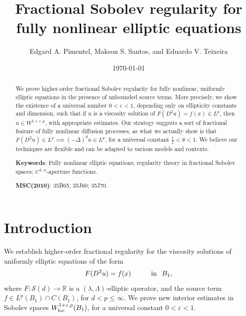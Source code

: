 \documentclass[10pt]{article} %
\begin{document}
\title{\bf Fractional Sobolev regularity for fully nonlinear elliptic equations}
\author{Edgard A. Pimentel, Makson S. Santos, and Eduardo V. Teixeira}

	
\date{\today} 

\maketitle

\begin{abstract}

\noindent  We prove higher-order fractional Sobolev regularity for fully nonlinear, uniformly elliptic equations in the presence of unbounded source terms. More precisely, we show the existence of a universal number $0< \varepsilon <1$, depending only on ellipticity constants and dimension, such that if $u$ is a viscosity solution of $F(D^2u) = f(x) \in L^p$, then $u\in  W^{1+\varepsilon,p}$, with appropriate estimates. Our strategy suggests a sort of fractional feature of fully nonlinear diffusion processes, as what we actually show is that $F(D^2u) \in L^p \implies (-\Delta)^\theta u \in L^p$, for a universal constant $\frac{1}{2} < \theta <1$.  We believe our techniques are flexible and can be adapted to various models and contexts.

\medskip

\noindent \textbf{Keywords}: Fully nonlinear elliptic equations; regularity theory in fractional Sobolev spaces; $ C ^{1,\alpha}$-aperture functions.

\medskip 

\noindent \textbf{MSC(2010)}: 35B65; 35J60; 35J70.
\end{abstract}


\section{Introduction}\label{introduction}

We establish higher-order fractional regularity for the viscosity solutions of uniformly elliptic equations of the form
\begin{equation}\label{eq_main}
	F(D^2u) = f(x) \hspace{.4in}\mbox{in}\hspace{.1in} B_1,
\end{equation}
where $F\colon \mathcal{S}(d)\to\mathbb{R}$ is a $(\lambda,\Lambda)$-elliptic operator, and the source term $f\in L^p(B_1)\cap C(B_1)$, for $d<p\leq\infty$. We prove new interior estimates in Sobolev spaces $W^{1+\varepsilon,p}_{\rm loc}(B_1)$, for a universal constant $0< \varepsilon < 1$. 
\end{document}
